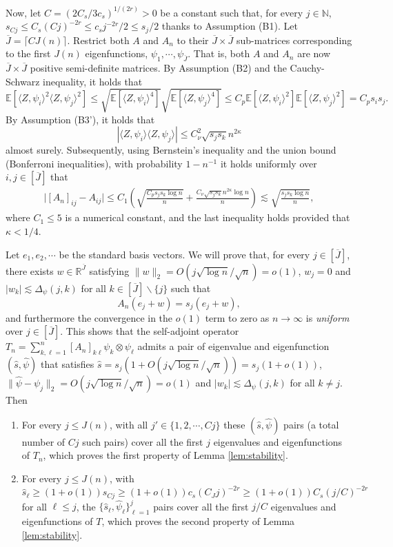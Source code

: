 \documentclass[11pt,a4paper]{article}
\renewcommand{\hat}{\widehat}
\renewcommand{\bar}{\overline}
\theoremstyle{definition}
\theoremstyle{plain}
\theoremstyle{remark}
\begin{document}
Now, let $C=(2C_s/3c_s)^{1/(2r)}>0$ be a constant such that, for every $j\in\mathbb N$, $s_{Cj}\leq C_s (Cj)^{-2r} \leq c_sj^{-2r}/2\leq s_j/2$ thanks to Assumption (B1). 
Let $\bar J=\lceil CJ(n)\rceil$.
Restrict both $A$ and $A_n$ to their $\bar J\times \bar J$ sub-matrices corresponding to the first $J(n)$ eigenfunctions, $\psi_1,\cdots,\psi_{\bar J}$.
That is, both $A$ and $A_n$ are now $\bar J\times\bar J$ positive semi-definite matrices.
By Assumption (B2) and the Cauchy-Schwarz inequality, it holds that 
$$
\mathbb E[\langle Z,\psi_i\rangle^2\langle Z,\psi_j\rangle^2] \leq \sqrt{\mathbb E[\langle Z,\psi_i\rangle^4]}\sqrt{\mathbb E[\langle Z,\psi_j\rangle^4]}
\leq C_p\mathbb E[\langle Z,\psi_i\rangle^2]\mathbb E[\langle Z,\psi_j\rangle^2] = C_ps_is_j.
$$
By Assumption (B3'), it holds that 
$$
|\langle Z,\psi_i\rangle\langle Z,\psi_j\rangle| \leq C_\nu^2\sqrt{s_js_k}n^{2\kappa}
$$ almost surely.
Subsequently, using Bernstein's inequality and the union bound (Bonferroni inequalities), with probability $1-n^{-1}$ it holds uniformly over $i,j\in[\bar J]$ that 
\begin{align}
\big|[A_n]_{ij}-A_{ij}\big| \leq C_1\left(\sqrt{\frac{C_ps_js_k\log n}{n}} + \frac{C_\nu\sqrt{s_js_k}n^{2\kappa}\log n}{n}\right) \lesssim \sqrt{\frac{s_js_k\log n}{n}},
\label{eq:proof-stability-1}
\end{align}
where $C_1\leq 5$ is a numerical constant, and the last inequality holds provided that $\kappa<1/4$.

Let $e_1,e_2,\cdots$ be the standard basis vectors.
We will prove that, for every $j\in[\bar J]$, there exists $w\in\mathbb R^{\bar J}$ satisfying $\|w\|_2 = O(j\sqrt{\log n}/\sqrt{n})=o(1)$, $w_j=0$ and $|w_k|\lesssim \Delta_\psi(j,k)$ for all $k\in[\bar J]\backslash\{j\}$ such that
\begin{equation}
A_n (e_j+w) = s_j(e_j+w),
\label{eq:eigen-an}
\end{equation}
and furthermore the convergence in the $o(1)$ term to zero as $n\to\infty$ is \emph{uniform} over $j\in[\bar J]$.
This shows that the self-adjoint operator $T_n=\sum_{k,\ell=1}^{n}[A_n]_{k\ell}\psi_k\otimes\psi_\ell$ admits a pair of eigenvalue and eigenfunction $(\hat s,\hat\psi)$ that satisfies
$\hat s=s_j(1+O(j\sqrt{\log n}/\sqrt{n}))=s_j(1+o(1))$, $\|\hat\psi-\psi_j\|_2=O(j\sqrt{\log n}/\sqrt{n})=o(1)$ and $|w_k|\lesssim \Delta_\psi(j,k)$ for all $k\neq j$. Then
\begin{enumerate}
\item For every $j\leq J(n)$, with all $j'\in\{1,2,\cdots,C j\}$ these $(\hat s,\hat\psi)$ pairs (a total number of $C j$ such pairs) cover all the first $j$ eigenvalues and eigenfunctions
of $T_n$, which proves the first property of Lemma \ref{lem:stability}.
\item For every $j\leq J(n)$, with $\hat s_\ell\geq (1+o(1))s_{C j}\geq (1+o(1))c_s (C_Jj)^{-2r}\geq (1+o(1))C_s (j/C)^{-2r}$ for all $\ell\leq j$, 
the $\{\hat s_\ell,\hat\psi_\ell\}_{\ell=1}^{j}$ pairs cover all the first $j/C$ eigenvalues and eigenfunctions of $T$, which proves the second property of Lemma \ref{lem:stability}.
\end{enumerate}
\end{document}
